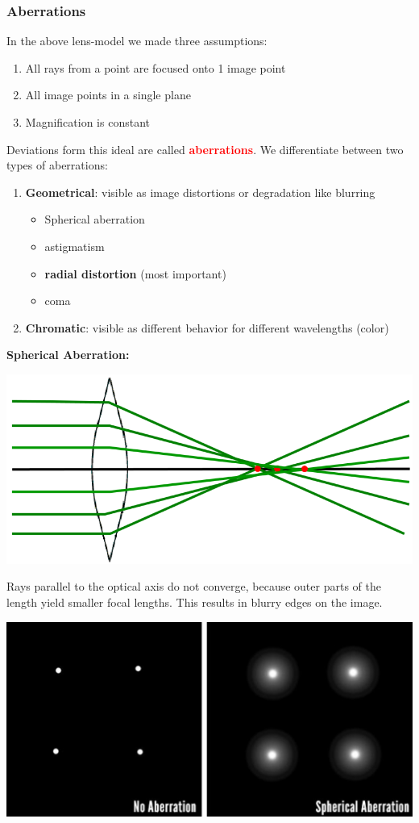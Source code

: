 \documentclass[a4paper, fontsize=8pt, landscape, DIV=1]{scrartcl}
\begin{document}
\begin{multicols*}{4}
		\subsubsection{Aberrations}
		In the above lens-model we made three assumptions:
		\begin{enumerate}[noitemsep]
			\item All rays from a point are focused onto 1 image point
			\item All image points in a single plane
			\item Magnification is constant
		\end{enumerate}
		Deviations form this ideal are called \textcolor{red}{\textbf{aberrations}}. We differentiate between two types of aberrations:
		\begin{enumerate}[noitemsep]
			\item \textbf{Geometrical}: visible as image distortions or degradation like blurring
				\begin{itemize}
					\item Spherical aberration
					\item astigmatism
					\item \textbf{radial distortion} (most important)
					\item coma
				\end{itemize}
			\item \textbf{Chromatic}: visible as different behavior for different wavelengths (color)
		\end{enumerate}
		
		\textbf{Spherical Aberration:}\\
		\begin{center}
			\includegraphics[width=0.7\columnwidth]{images/ImageAcq/spherical_aberration.png}\\
		\end{center}
		Rays parallel to the optical axis do not converge, because outer parts of the length yield smaller focal lengths. This results in blurry edges on the image.
		\begin{center}
			\includegraphics[width=0.7\columnwidth]{images/ImageAcq/spherical_aberration_2.png}\\
		\end{center}
		\vfill\null
		\columnbreak
		

\end{multicols*}
\end{document}
